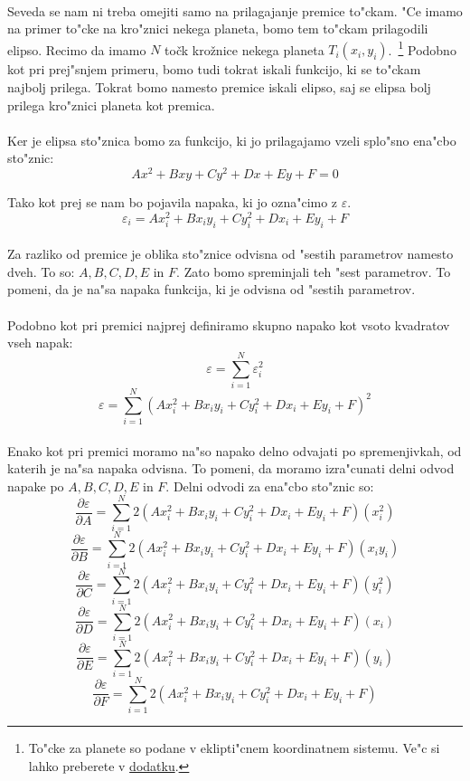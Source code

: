 \paragraph{}
Seveda se nam ni treba omejiti samo na prilagajanje premice to"ckam. "Ce imamo na primer to"cke na kro"znici nekega planeta, bomo tem to"ckam prilagodili elipso. Recimo da imamo $N$ točk krožnice nekega planeta $T_i(x_i, y_i)$.~\footnote{To"cke za planete so podane v eklipti"cnem koordinatnem sistemu. Ve"c si lahko preberete v \hyperref[eklipticni_sistem]{dodatku}.} Podobno kot pri prej"snjem primeru, bomo tudi tokrat iskali funkcijo, ki se to"ckam najbolj prilega. Tokrat bomo namesto premice iskali elipso, saj se elipsa bolj prilega kro"znici planeta kot premica.

\paragraph{}
Ker je elipsa sto"znica bomo za funkcijo, ki jo prilagajamo vzeli splo"sno ena"cbo sto"znic:
$$Ax^2 + Bxy + Cy^2 + Dx + Ey + F = 0$$

Tako kot prej se nam bo pojavila napaka, ki jo ozna"cimo z $\varepsilon$.
$$\varepsilon_i = Ax_i^2 + Bx_iy_i + Cy_i^2 + Dx_i + Ey_i + F$$

\paragraph{}
Za razliko od premice je oblika sto"znice odvisna od "sestih parametrov namesto dveh. To so: $A, B, C, D, E$ in $F$. Zato bomo spreminjali teh "sest parametrov. To pomeni, da je na"sa napaka funkcija, ki je odvisna od "sestih parametrov.

\paragraph{}
Podobno kot pri premici najprej definiramo skupno napako kot vsoto kvadratov vseh napak:
\[\varepsilon = \sum_{i=1}^{N}\varepsilon_i^2\]
\[\varepsilon = \sum_{i=1}^{N} (Ax_i^2 + Bx_iy_i + Cy_i^2 + Dx_i + Ey_i + F)^2\]

\paragraph{}
Enako kot pri premici moramo na"so napako delno odvajati po spremenjivkah, od katerih je na"sa napaka odvisna. To pomeni, da moramo izra"cunati delni odvod napake po $A, B, C, D, E$ in $F$. Delni odvodi za ena"cbo sto"znic so:
$$\frac{\partial \varepsilon}{\partial A} = \sum_{i=1}^{N}2(Ax_i^2 + Bx_iy_i + Cy_i^2 + Dx_i + Ey_i + F)(x_i^2)$$
$$\frac{\partial \varepsilon}{\partial B} = \sum_{i=1}^{N}2(Ax_i^2 + Bx_iy_i + Cy_i^2 + Dx_i + Ey_i + F)(x_iy_i)$$
$$\frac{\partial \varepsilon}{\partial C} = \sum_{i=1}^{N}2(Ax_i^2 + Bx_iy_i + Cy_i^2 + Dx_i + Ey_i + F)(y_i^2)$$
$$\frac{\partial \varepsilon}{\partial D} = \sum_{i=1}^{N}2(Ax_i^2 + Bx_iy_i + Cy_i^2 + Dx_i + Ey_i + F)(x_i)$$
$$\frac{\partial \varepsilon}{\partial E} = \sum_{i=1}^{N}2(Ax_i^2 + Bx_iy_i + Cy_i^2 + Dx_i + Ey_i + F)(y_i)$$
$$\frac{\partial \varepsilon}{\partial F} = \sum_{i=1}^{N}2(Ax_i^2 + Bx_iy_i + Cy_i^2 + Dx_i + Ey_i + F)$$

